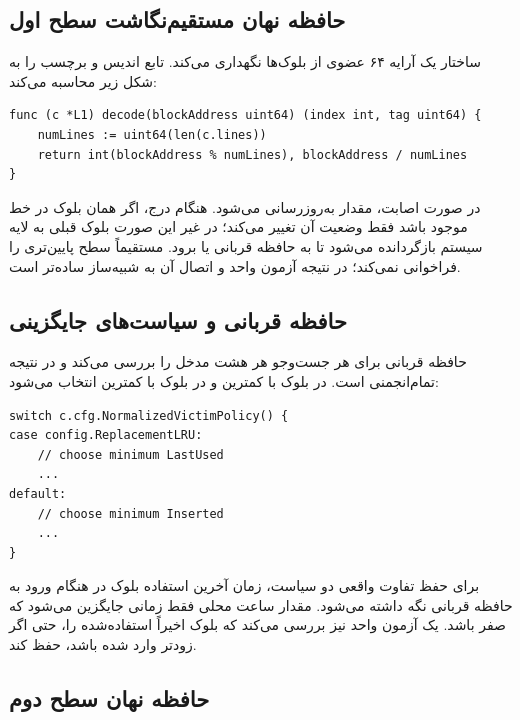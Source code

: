 \documentclass[oneside,a4paper,12pt]{article}
\newcommand{\مهم}[1]{\textbf{#1}}
\newcommand{\درصد}[1]{\lr{#1\%}}
\begin{document}
\subsection{حافظه نهان مستقیم‌نگاشت سطح اول}

ساختار  یک آرایه ۶۴ عضوی از بلوک‌ها نگهداری می‌کند. تابع  اندیس و برچسب را به شکل زیر محاسبه می‌کند:

\begin{latin}
\begin{lstlisting}[caption={\lr{L1 index and tag decoding}}]
func (c *L1) decode(blockAddress uint64) (index int, tag uint64) {
    numLines := uint64(len(c.lines))
    return int(blockAddress % numLines), blockAddress / numLines
}
\end{lstlisting}
\end{latin}

در صورت اصابت، مقدار  به‌روزرسانی می‌شود. هنگام درج، اگر همان بلوک در خط موجود باشد فقط وضعیت آن تغییر می‌کند؛ در غیر این صورت بلوک قبلی به لایه سیستم بازگردانده می‌شود تا به حافظه قربانی یا  برود.  مستقیماً سطح پایین‌تری را فراخوانی نمی‌کند؛ در نتیجه آزمون واحد و اتصال آن به شبیه‌ساز ساده‌تر است.

\subsection{حافظه قربانی و سیاست‌های جایگزینی}

حافظه قربانی برای هر جست‌وجو هر هشت مدخل را بررسی می‌کند و در نتیجه تمام‌انجمنی است. در  بلوک با کمترین  و در  بلوک با کمترین  انتخاب می‌شود:

\begin{latin}
\begin{lstlisting}[caption={\lr{FIFO and LRU victim selection}}]
switch c.cfg.NormalizedVictimPolicy() {
case config.ReplacementLRU:
    // choose minimum LastUsed
    ...
default:
    // choose minimum Inserted
    ...
}
\end{lstlisting}
\end{latin}

برای حفظ تفاوت واقعی دو سیاست، زمان آخرین استفاده بلوک در  هنگام ورود به حافظه قربانی نگه داشته می‌شود. مقدار ساعت محلی فقط زمانی جایگزین می‌شود که  صفر باشد. یک آزمون واحد نیز بررسی می‌کند که  بلوک اخیراً استفاده‌شده را، حتی اگر زودتر وارد شده باشد، حفظ کند.

\subsection{حافظه نهان سطح دوم}
\end{document}
